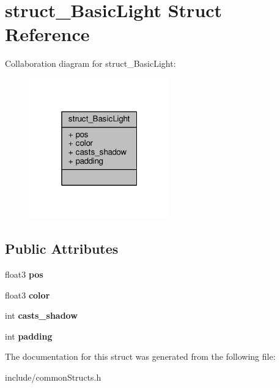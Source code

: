 \hypertarget{structstruct___basic_light}{\section{struct\-\_\-\-Basic\-Light Struct Reference}
\label{structstruct___basic_light}
}


Collaboration diagram for struct\-\_\-\-Basic\-Light\-:
\nopagebreak
\begin{figure}[H]
\begin{center}
\leavevmode
\includegraphics[width=172pt]{structstruct___basic_light__coll__graph}
\end{center}
\end{figure}
\subsection*{Public Attributes}
\begin{DoxyCompactItemize}
\item 
\hypertarget{structstruct___basic_light_a5436033f773f3e7e0958dd5e042281e4}{float3 {\bfseries pos}}\label{structstruct___basic_light_a5436033f773f3e7e0958dd5e042281e4}

\item 
\hypertarget{structstruct___basic_light_a1e06fca4d1b83aa9e15c5b6c8a875fa5}{float3 {\bfseries color}}\label{structstruct___basic_light_a1e06fca4d1b83aa9e15c5b6c8a875fa5}

\item 
\hypertarget{structstruct___basic_light_a32ab37bd74e4d69c7fa307a9384ea96d}{int {\bfseries casts\-\_\-shadow}}\label{structstruct___basic_light_a32ab37bd74e4d69c7fa307a9384ea96d}

\item 
\hypertarget{structstruct___basic_light_a7f6223f6d59e32fe888fbbc90f2d997f}{int {\bfseries padding}}\label{structstruct___basic_light_a7f6223f6d59e32fe888fbbc90f2d997f}

\end{DoxyCompactItemize}


The documentation for this struct was generated from the following file\-:\begin{DoxyCompactItemize}
\item 
include/common\-Structs.\-h\end{DoxyCompactItemize}
